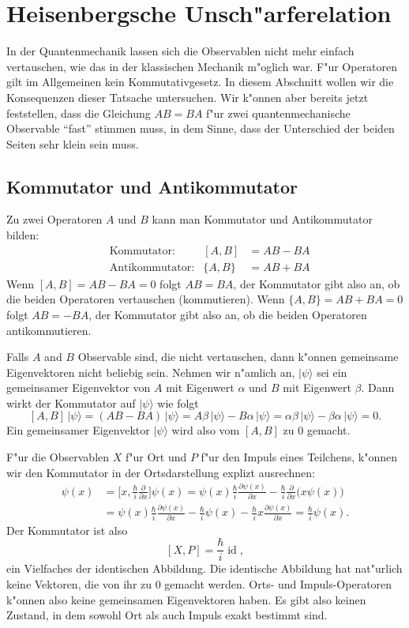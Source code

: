 \chapter{Heisenbergsche Unsch"arferelation\label{chapter:heisenberg}}
\rhead{}

In der Quantenmechanik lassen sich die Observablen nicht mehr einfach
vertauschen, wie das in der klassischen Mechanik m"oglich war.
F"ur Operatoren gilt im Allgemeinen kein Kommutativgesetz.
In diesem Abschnitt wollen wir die Konsequenzen dieser Tatsache
untersuchen.
Wir k"onnen aber bereits jetzt feststellen, dass die Gleichung
$AB=BA$ f"ur zwei quantenmechanische Observable ``fast'' stimmen
muss, in dem Sinne, dass der Unterschied der beiden Seiten sehr
klein sein muss. 

\section{Kommutator und Antikommutator}
Zu zwei Operatoren $A$ und $B$ kann man Kommutator und Antikommutator
bilden:
\begin{align*}
&\text{Kommutator:}&
[A,B]&=AB-BA
\\
&\text{Antikommutator:}&
\{A,B\}&=AB+BA
\end{align*}
Wenn $[A,B]=AB-BA=0$ folgt $AB=BA$,
der Kommutator gibt also an, ob die beiden Operatoren vertauschen (kommutieren).
Wenn $\{A,B\}=AB+BA=0$ folgt $AB=-BA$,
der Kommutator gibt also an, ob die beiden Operatoren antikommutieren.

Falls $A$ and $B$ Observable sind, die nicht vertauschen, dann k"onnen
gemeinsame Eigenvektoren nicht beliebig sein.
Nehmen wir n"amlich an, $|\psi\rangle$ sei ein gemeinsamer Eigenvektor
von $A$ mit Eigenwert $\alpha$ und $B$ mit Eigenwert $\beta$.
Dann wirkt der Kommutator auf $|\psi\rangle$ wie folgt
\[
[A,B]\,|\psi\rangle
=
(AB-BA)\,|\psi\rangle 
=
A\beta\,|\psi\rangle -B\alpha\,|\psi\rangle
=
\alpha\beta\,|\psi\rangle-\beta\alpha\,|\psi\rangle
=
0.
\]
Ein gemeinsamer Eigenvektor $|\psi\rangle$ wird also vom $[A,B]$
zu $0$ gemacht.

F"ur die Observablen $X$ f"ur Ort und $P$ f"ur den Impuls eines Teilchens,
k"onnen wir den Kommutator in der Ortsdarstellung explizt ausrechnen:
\begin{align*}
[X,P]\psi(x)
&=
\biggl[
x,\frac{\hbar}{i}\frac{\partial}{\partial x}
\biggr]\psi(x)
=
\psi(x)\frac{\hbar}{i}\frac{\partial\psi(x)}{\partial x}
-
\frac{\hbar}{i}\frac{\partial}{\partial x}\biggl(x\psi(x)\biggr)
\\
&=
\psi(x)\frac{\hbar}{i}\frac{\partial\psi(x)}{\partial x}
-
\frac{\hbar}{i}\psi(x)
-
\frac{\hbar}{i}x\frac{\partial\psi(x)}{\partial x}
=
\frac{\hbar}{i}\psi(x).
\end{align*}
Der Kommutator ist also
\[
[X,P]=\frac{\hbar}{i}\operatorname{id},
\]
ein Vielfaches der identischen Abbildung.
Die identische Abbildung hat nat"urlich keine Vektoren, die von ihr
zu $0$ gemacht werden.
Orts- und Impuls-Operatoren k"onnen also keine gemeinsamen Eigenvektoren
haben.
Es gibt also keinen Zustand, in dem sowohl Ort als auch Impuls exakt
bestimmt sind.

